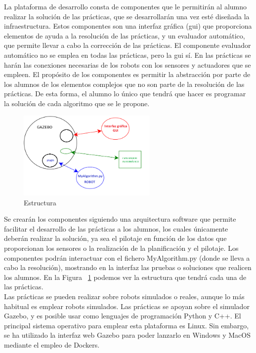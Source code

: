 La plataforma de desarrollo consta de componentes que le permitirán al alumno realizar la solución de las prácticas, que se desarrollarán una vez esté diseñada la infraestructura. Estos componentes son una interfaz gráfica (\acrshort{gui}) que proporciona elementos de ayuda a la resolución de las prácticas, y un evaluador automático, que permite llevar a cabo la corrección de las prácticas. El componente evaluador automático no se emplea en todas las prácticas, pero la \acrshort{gui} sí. En las prácticas se harán las conexiones necesarias de los robots con los sensores y actuadores que se empleen. El propósito de los componentes es permitir la abstracción por parte de los alumnos de los elementos complejos que no son parte de la resolución de las prácticas. De esta forma, el alumno lo único que tendrá que hacer es programar la solución de cada algoritmo que se le propone.
\begin{figure}[H]
  \begin{center}
    \includegraphics[width=0.6\textwidth]{figures/Introduccion/estructura.png}
		\caption{Estructura}
		\label{fig.estructura}
		\end{center}
\end{figure}

Se crearán los componentes siguiendo una arquitectura software que permite facilitar el desarrollo de las prácticas a los alumnos, los cuales únicamente deberán realizar la solución, ya sea el pilotaje en función de los datos que proporcionan los sensores  o la realización de la planificación y el pilotaje. Los componentes podrán interactuar con el fichero MyAlgorithm.py (donde se lleva a cabo la resolución), mostrando en la interfaz las pruebas o soluciones que realicen los alumnos. En la Figura ~\ref{fig.estructura} podemos ver la estructura que tendrá cada una de las prácticas.\\

Las prácticas se pueden realizar sobre robots simulados o reales, aunque lo más habitual es emplear robots simulados. Las prácticas se apoyan sobre el simulador Gazebo, y es posible usar como lenguajes de programación Python y C++. El principal sistema operativo para emplear esta plataforma es Linux. Sin embargo, se ha utilizado la interfaz web Gazebo para poder lanzarlo en Windows y MacOS mediante el empleo de Dockers.\\


